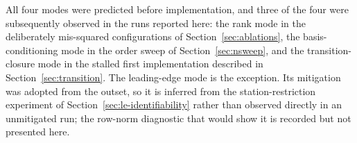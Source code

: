 All four modes were predicted before implementation, and three of the four
were subsequently observed in the runs reported here: the rank mode in the
deliberately mis-squared configurations of Section~\ref{sec:ablations}, the
basis-conditioning mode in the order sweep of Section~\ref{sec:nsweep}, and
the transition-closure mode in the stalled first implementation described in
Section~\ref{sec:transition}. The leading-edge mode is the exception. Its
mitigation was adopted from the outset, so it is inferred from the
station-restriction experiment of Section~\ref{sec:le-identifiability} rather
than observed directly in an unmitigated run; the row-norm diagnostic that
would show it is recorded but not presented here.
